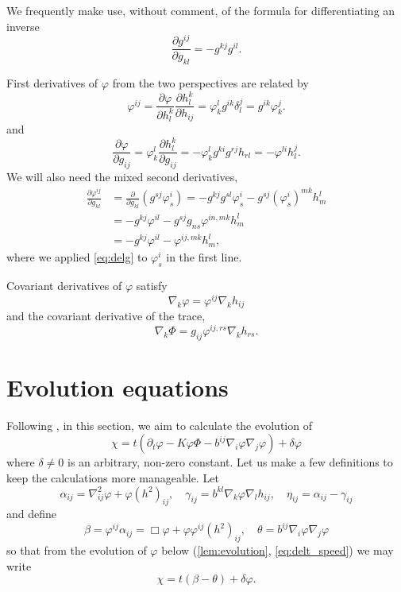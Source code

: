 \documentclass{amsart}
\begin{document}
We frequently make use, without comment, of the formula for differentiating an inverse
\[
\frac{\partial g^{ij}}{\partial g_{kl}} = - g^{kj} g^{il}.
\]

First derivatives of \(\varphi\) from the two perspectives are related by
\begin{equation}
\label{eq:delh}
\varphi^{ij} = \frac{\partial \varphi}{\partial h_l^k} \frac{\partial h_l^k}{\partial h_{ij}} = \varphi^l_k g^{ik} \delta^j_l = g^{ik} \varphi^j_k.
\end{equation}
and
\begin{equation}
\label{eq:delg}
\frac{\partial\varphi}{\partial g_{ij}} = \varphi^{l}_{k} \frac{\partial h^{k}_{l}}{\partial g_{ij}} = -\varphi^{l}_{k} g^{ki} g^{rj} h_{rl} = -\varphi^{li}h^{j}_{l}.
\end{equation}
We will also need the mixed second derivatives,
\begin{equation}
\label{eq:delhdelg}
\begin{split}
\frac{\partial \varphi^{ij}}{\partial g_{kl}} &= \frac{\partial}{\partial g_{kl}} \left(g^{sj} \varphi^{i}_{s} \right) = - g^{kj}g^{sl} \varphi^{i}_{s} - g^{sj} (\varphi^i_s)^{mk} h^l_m \\
&= - g^{kj} \varphi^{il} - g^{sj} g_{ns} \varphi^{in,mk} h^l_m \\
&= - g^{kj} \varphi^{il} - \varphi^{ij,mk} h^l_m,
\end{split}
\end{equation}
where we applied \cref{eq:delg} to \(\varphi^i_s\) in the first line.

Covariant derivatives of \(\varphi\) satisfy
\begin{equation}
\label{eq:delphi}
\nabla_k \varphi = \varphi^{ij} \nabla_k h_{ij}
\end{equation}
and the covariant derivative of the trace,
\begin{equation}
\label{eq:delPhi}
\nabla_k \Phi = g_{ij} \varphi^{ij,rs} \nabla_k h_{rs}.
\end{equation}

\section{Evolution equations}

Following \cite{MR1296393, MR1100812, MR1316556, MR1480081}, in this section, we aim to calculate the evolution of
\[
\chi =t(\partial_t \varphi - K \varphi \Phi - b^{ij} \nabla_i \varphi \nabla_j \varphi) +\delta\varphi
\]
where \(\delta \ne 0\) is an arbitrary, non-zero constant. Let us make a few definitions to keep the calculations more manageable. Let
\[
\alpha_{ij} = \nabla^2_{ij} \varphi + \varphi(h^2)_{ij}, \quad \gamma_{ij} = b^{kl} \nabla_k \varphi \nabla_l h_{ij}, \quad \eta_{ij} = \alpha_{ij} - \gamma_{ij}
\]
and define
\[
\beta = \varphi^{ij} \alpha_{ij} = \Box\varphi + \varphi \varphi^{ij}(h^2)_{ij}, \quad \theta =  b^{ij} \nabla_i \varphi \nabla_j \varphi
\]
so that from the evolution of \(\varphi\) below (\cref{lem:evolution}, \cref{eq:delt_speed}) we may write
\[
\chi = t(\beta - \theta) + \delta\varphi.
\]
\end{document}
